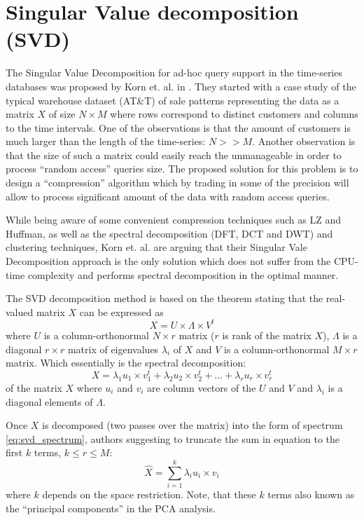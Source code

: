 \section{Singular Value decomposition (SVD)}
The Singular Value Decomposition for ad-hoc query support in the time-series databases was proposed by Korn et. al. in \cite{citeulike:4373332}. They started with a case study of the typical warehouse dataset (AT\&T) of sale patterns representing the data as a matrix $X$ of size $N \times M$ where rows correspond to distinct customers and columns to the time intervals. One of the observations is that the amount of customers is much larger than the length of the time-series: $N>>M$. Another observation is that the size of such a matrix could easily reach the unmanageable in order to process ``random access'' queries size. The proposed solution for this problem is to design a ``compression'' algorithm which by trading in some of the precision will allow to process significant amount of the data with random access queries. 

While being aware of some convenient compression techniques such as LZ and Huffman, as well as the spectral decomposition (DFT, DCT and DWT) and clustering techniques, Korn et. al. are arguing that their Singular Vale Decomposition approach is the only solution which does not suffer from the CPU-time complexity and performs spectral decomposition in the optimal manner.

The SVD decomposition method is based on the theorem stating that the real-valued matrix $X$ can be expressed as 
\begin{equation}
X = U \times \Lambda \times V^{t}
\label{eq:svd_transform}
\end{equation}
where $U$ is a column-orthonormal $N \times r$ matrix ($r$ is rank of the matrix $X$), $\Lambda$ is a diagonal $r \times r$ matrix of eigenvalues $\lambda_{i}$ of $X$ and $V$ is a column-orthonormal $M \times r$ matrix. Which essentially is the spectral decomposition:
\begin{equation}
X = \lambda_{1} u_{1} \times v_{1}^{t} + \lambda_{2} u_{2} \times v_{2}^{t} + \ldots + \lambda_{r} u_{r} \times v_{r}^{t}
\label{eq:svd_spectrum}
\end{equation}
of the matrix $X$ where $u_{i}$ and $v_{i}$ are column vectors of the $U$ and $V$ and $\lambda_{i}$ is a diagonal elements of $\Lambda$.

Once $X$ is decomposed (two passes over the matrix) into the form of spectrum \ref{eq:svd_spectrum}, authors suggesting to truncate the sum in equation to the first $k$ terms, $k \leq r \leq M$:
\begin{equation}
\hat{X} = \sum_{i=1}^{k} \lambda_{i} u_{i} \times v_{i}
\label{eq:svd}
\end{equation}
where $k$ depends on the space restriction. Note, that these $k$ terms also known as the ``principal components'' in the PCA analysis. 

